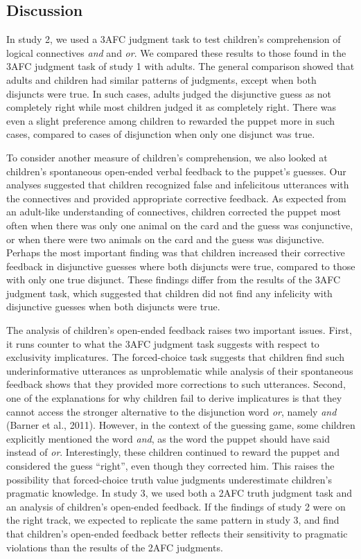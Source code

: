 \documentclass[,man,floatsintext]{apa6}
\begin{document}
\hypertarget{discussion-1}{%
\subsection{Discussion}\label{discussion-1}}

In study 2, we used a 3AFC judgment task to test children's comprehension of logical connectives \emph{and} and \emph{or}. We compared these results to those found in the 3AFC judgment task of study 1 with adults. The general comparison showed that adults and children had similar patterns of judgments, except when both disjuncts were true. In such cases, adults judged the disjunctive guess as not completely right while most children judged it as completely right. There was even a slight preference among children to rewarded the puppet more in such cases, compared to cases of disjunction when only one disjunct was true.

To consider another measure of children's comprehension, we also looked at children's spontaneous open-ended verbal feedback to the puppet's guesses. Our analyses suggested that children recognized false and infelicitous utterances with the connectives and provided appropriate corrective feedback. As expected from an adult-like understanding of connectives, children corrected the puppet most often when there was only one animal on the card and the guess was conjunctive, or when there were two animals on the card and the guess was disjunctive. Perhaps the most important finding was that children increased their corrective feedback in disjunctive guesses where both disjuncts were true, compared to those with only one true disjunct. These findings differ from the results of the 3AFC judgment task, which suggested that children did not find any infelicity with disjunctive guesses when both disjuncts were true.

The analysis of children's open-ended feedback raises two important issues. First, it runs counter to what the 3AFC judgment task suggests with respect to exclusivity implicatures. The forced-choice task suggests that children find such underinformative utterances as unproblematic while analysis of their spontaneous feedback shows that they provided more corrections to such utterances. Second, one of the explanations for why children fail to derive implicatures is that they cannot access the stronger alternative to the disjunction word \emph{or}, namely \emph{and} (Barner et al., 2011). However, in the context of the guessing game, some children explicitly mentioned the word \emph{and}, as the word the puppet should have said instead of \emph{or}. Interestingly, these children continued to reward the puppet and considered the guess \enquote{right}, even though they corrected him. This raises the possibility that forced-choice truth value judgments underestimate children's pragmatic knowledge. In study 3, we used both a 2AFC truth judgment task and an analysis of children's open-ended feedback. If the findings of study 2 were on the right track, we expected to replicate the same pattern in study 3, and find that children's open-ended feedback better reflects their sensitivity to pragmatic violations than the results of the 2AFC judgments.
\end{document}
